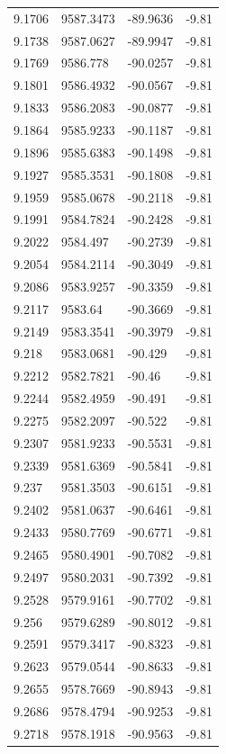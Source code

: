 \begin{table}[H]
\begin{tabular}{llll}
9.1706 & 9587.3473 & -89.9636 & -9.81 \\
9.1738 & 9587.0627 & -89.9947 & -9.81 \\
9.1769 & 9586.778 & -90.0257 & -9.81 \\
9.1801 & 9586.4932 & -90.0567 & -9.81 \\
9.1833 & 9586.2083 & -90.0877 & -9.81 \\
9.1864 & 9585.9233 & -90.1187 & -9.81 \\
9.1896 & 9585.6383 & -90.1498 & -9.81 \\
9.1927 & 9585.3531 & -90.1808 & -9.81 \\
9.1959 & 9585.0678 & -90.2118 & -9.81 \\
9.1991 & 9584.7824 & -90.2428 & -9.81 \\
9.2022 & 9584.497 & -90.2739 & -9.81 \\
9.2054 & 9584.2114 & -90.3049 & -9.81 \\
9.2086 & 9583.9257 & -90.3359 & -9.81 \\
9.2117 & 9583.64 & -90.3669 & -9.81 \\
9.2149 & 9583.3541 & -90.3979 & -9.81 \\
9.218 & 9583.0681 & -90.429 & -9.81 \\
9.2212 & 9582.7821 & -90.46 & -9.81 \\
9.2244 & 9582.4959 & -90.491 & -9.81 \\
9.2275 & 9582.2097 & -90.522 & -9.81 \\
9.2307 & 9581.9233 & -90.5531 & -9.81 \\
9.2339 & 9581.6369 & -90.5841 & -9.81 \\
9.237 & 9581.3503 & -90.6151 & -9.81 \\
9.2402 & 9581.0637 & -90.6461 & -9.81 \\
9.2433 & 9580.7769 & -90.6771 & -9.81 \\
9.2465 & 9580.4901 & -90.7082 & -9.81 \\
9.2497 & 9580.2031 & -90.7392 & -9.81 \\
9.2528 & 9579.9161 & -90.7702 & -9.81 \\
9.256 & 9579.6289 & -90.8012 & -9.81 \\
9.2591 & 9579.3417 & -90.8323 & -9.81 \\
9.2623 & 9579.0544 & -90.8633 & -9.81 \\
9.2655 & 9578.7669 & -90.8943 & -9.81 \\
9.2686 & 9578.4794 & -90.9253 & -9.81 \\
9.2718 & 9578.1918 & -90.9563 & -9.81 \\

\end{tabular}
\end{table}
